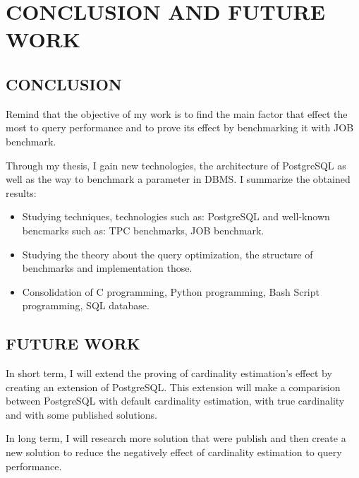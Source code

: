 
\chapter{CONCLUSION AND FUTURE WORK}\label{chapter:future work}
\section{CONCLUSION}
{\justify
Remind that the objective of my work is to find the main factor that effect the most to query performance and to prove its effect by benchmarking it with JOB benchmark. 
\par }
\vspace{0.5cm}
{\justify
Through my thesis, I gain new technologies, the architecture of PostgreSQL as well as the way to benchmark a parameter in DBMS. I summarize the obtained results:
\begin{itemize}
\item Studying techniques, technologies such as: PostgreSQL and well-known bencmarks such as: TPC benchmarks, JOB benchmark.
\item Studying the theory about the query optimization, the structure of benchmarks and implementation those.
\item Consolidation of C programming, Python programming, Bash Script programming, SQL database.
\end{itemize} 
\par }
\vspace{0.5cm}
\section{FUTURE WORK}
{\justify
In short term, I will extend the proving of cardinality estimation's effect by creating an extension of PostgreSQL. This extension will make a comparision between PostgreSQL with default cardinality estimation, with true cardinality and with some published solutions. 
\par }
\vspace{0.5cm}
{\justify
In long term, I will research more solution that were publish and then create a new solution to reduce the negatively effect of cardinality estimation to query performance.
\par }
\vspace{0.5cm}

